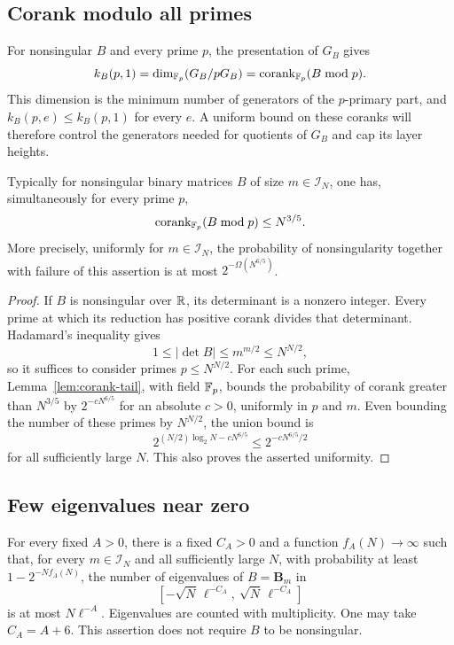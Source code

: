 \subsection{Corank modulo all primes}

For nonsingular \(B\) and every prime \(p\), the presentation of \(G_B\) gives
\[
 k_B(p,1)=\dim_{\mathbb F_p}(G_B/pG_B)
          =\operatorname{corank}_{\mathbb F_p}(B\bmod p).
\]
This dimension is the minimum number of generators of the \(p\)-primary
part, and \(k_B(p,e)\le k_B(p,1)\) for every \(e\). A uniform bound on
these coranks will therefore control the generators needed for quotients
of \(G_B\) and cap its layer heights.

\begin{proposition}\label{prop:prime-corank}
Typically for nonsingular binary matrices \(B\) of size
\(m\in\mathcal I_N\), one has, simultaneously for every prime \(p\),
\[
 \operatorname{corank}_{\mathbb F_p}(B\bmod p)\le N^{3/5}.
\]
More precisely, uniformly for \(m\in\mathcal I_N\), the probability
of nonsingularity together with failure of this assertion is at most
\(2^{-\Omega(N^{6/5})}\).
\end{proposition}

\begin{proof}
If \(B\) is nonsingular over \(\mathbb R\), its determinant is a nonzero
integer. Every prime at which its reduction has positive corank
divides that determinant. Hadamard's inequality gives
\[
 1\le |\det B|\le m^{m/2}\le N^{N/2},
\]
so it suffices to consider primes \(p\le N^{N/2}\). For each such
prime, Lemma~\ref{lem:corank-tail}, with field \(\mathbb F_p\), bounds the
probability of corank greater than \(N^{3/5}\) by
\(2^{-cN^{6/5}}\) for an absolute \(c>0\), uniformly in \(p\) and
\(m\). Even bounding the number of these primes by \(N^{N/2}\),
the union bound is
\[
 2^{(N/2)\log_2N-cN^{6/5}}
   \le 2^{-cN^{6/5}/2}
\]
for all sufficiently large \(N\). This also proves the asserted
uniformity.
\end{proof}

\subsection{Few eigenvalues near zero}

\begin{proposition}\label{prop:typical-spectrum}
For every fixed \(A>0\), there is a fixed \(C_A>0\) and a function
\(f_A(N)\to\infty\) such that, for every \(m\in\mathcal I_N\) and
all sufficiently large \(N\), with probability at least
\(1-2^{-Nf_A(N)}\), the number of eigenvalues of \(B=\mathbf B_m\)
in
\[
 [-\sqrt N\,\ell^{-C_A},\ \sqrt N\,\ell^{-C_A}]
\]
is at most \(N\ell^{-A}\). Eigenvalues are counted with multiplicity.
One may take \(C_A=A+6\). This assertion does not require \(B\) to
be nonsingular.
\end{proposition}

